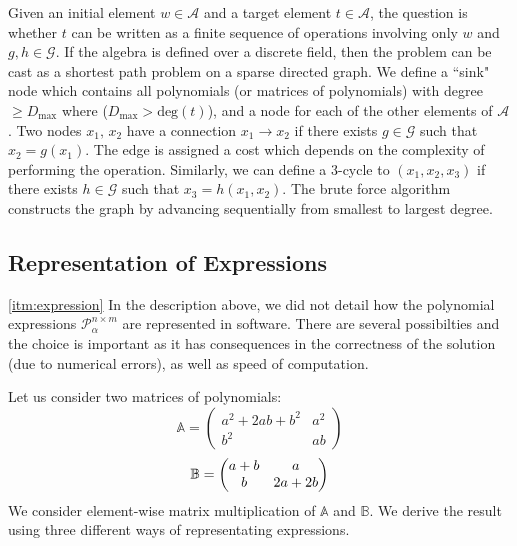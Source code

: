 Given an initial element $w \in \mathcal{A}$ and a target element $t \in \mathcal{A}$, 
the question is whether $t$ can be written as a finite sequence of operations involving 
only $w$ and $g,h \in \mathcal{G}$.
If the algebra is defined over a discrete field, then the problem can be  
cast as a shortest path problem on a sparse directed graph. 
We define a ``sink" node which contains all polynomials (or matrices of polynomials) with degree $\geq D_{\max}$ 
where ($D_{\max} > \mbox{deg}(t)$), and a node for each of the other elements of $\mathcal{A}$. 
Two nodes $x_1,\,x_2$ have a connection $x_1 \rightarrow x_2$ if there exists $g \in \mathcal{G}$ such that
$x_2 = g(x_1)$. The edge is assigned a cost which depends on the complexity of performing the operation.   
Similarly, we can define a 3-cycle to $(x_1,x_2,x_3)$ if there exists
$h \in \mathcal{G}$ such that $x_3 = h(x_1,x_2)$. The brute force algorithm constructs the graph by advancing sequentially from smallest to largest degree. 


\subsection{Representation of Expressions} \label{representation}
\ref{itm:expression}
In the description above, we did not detail how the polynomial
expressions $\mathcal{P}^{n \times m}_\alpha$ are represented in software. 
There are several possibilties and the choice is
important as it has consequences in the correctness of the solution
(due to numerical errors), as well as speed of computation.

Let us consider two matrices of polynomials:
\begin{equation}
\label{eq:a_matrix}
\mathbb{A} = \begin{pmatrix} a^2 + 2ab + b^2 & a^2\\ b^2 & ab \end{pmatrix} 
\end{equation}
\begin{equation}
\label{eq:b_matrix}
\mathbb{B} = \begin{pmatrix} a + b & a\\ b & 2a + 2b \end{pmatrix} \vspace{-1mm}
\vspace{-1mm}
\end{equation}
We consider element-wise matrix multiplication of $\mathbb{A}$ and
$\mathbb{B}$. We derive the result using three different ways of
representating expressions.



